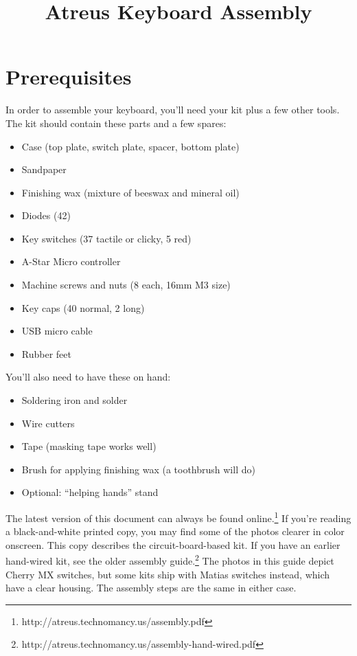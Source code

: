 \documentclass{article}
\title{Atreus Keyboard Assembly}
\date{ }
\begin{document}
\setlength{\parindent}{0cm}
\maketitle
\section{Prerequisites}

In order to assemble your keyboard, you'll need your kit plus a few
other tools. The kit should contain these parts and a few spares:

\begin{itemize}
\item Case (top plate, switch plate, spacer, bottom plate)
\item Sandpaper
\item Finishing wax (mixture of beeswax and mineral oil)
\item Diodes (42)
\item Key switches (37 tactile or clicky, 5 red)
\item A-Star Micro controller
\item Machine screws and nuts (8 each, 16mm M3 size)
\item Key caps (40 normal, 2 long)
\item USB micro cable
\item Rubber feet
\end{itemize}

You'll also need to have these on hand:

\begin{itemize}
\item Soldering iron and solder
\item Wire cutters
\item Tape (masking tape works well)
\item Brush for applying finishing wax (a toothbrush will do)
\item Optional: ``helping hands'' stand
\end{itemize}

\vspace{1em}

The latest version of this document can always be found
online.\footnote{http://atreus.technomancy.us/assembly.pdf} If you're
reading a black-and-white printed copy, you may find some of the
photos clearer in color onscreen. This copy describes the
circuit-board-based kit. If you have an earlier hand-wired kit, see
the older assembly
guide.\footnote{http://atreus.technomancy.us/assembly-hand-wired.pdf}
The photos in this guide depict Cherry MX switches, but some kits ship
with Matias switches instead, which have a clear housing. The assembly
steps are the same in either case.
\end{document}
